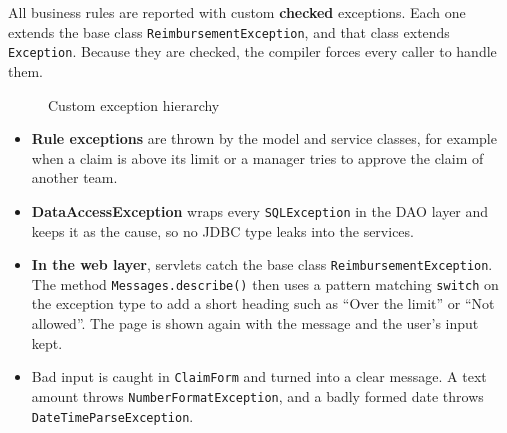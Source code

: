 \documentclass[12pt,a4paper]{report}
\begin{document}
All business rules are reported with custom \textbf{checked} exceptions. Each one extends the base class \texttt{ReimbursementException}, and that class extends \texttt{Exception}. Because they are checked, the compiler forces every caller to handle them.

\begin{figure}[H]
\centering
{}
\caption{Custom exception hierarchy}
\end{figure}

\begin{itemize}
  \item \textbf{Rule exceptions} are thrown by the model and service classes, for example when a claim is above its limit or a manager tries to approve the claim of another team.
  \item \textbf{DataAccessException} wraps every \texttt{SQLException} in the DAO layer and keeps it as the cause, so no JDBC type leaks into the services.
  \item \textbf{In the web layer}, servlets catch the base class \texttt{ReimbursementException}. The method \texttt{Messages.describe()} then uses a pattern matching \texttt{switch} on the exception type to add a short heading such as ``Over the limit'' or ``Not allowed''. The page is shown again with the message and the user's input kept.
  \item Bad input is caught in \texttt{ClaimForm} and turned into a clear message. A text amount throws \texttt{NumberFormatException}, and a badly formed date throws \texttt{DateTimeParseException}.
\end{itemize}
\end{document}
